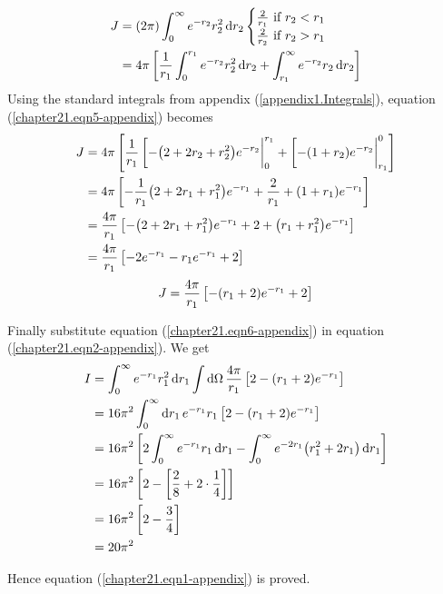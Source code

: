 	\begin{align}
		J &= \qty(2 \pi) \int_{0}^{\infty} e^{-r_2} r_2^2 \dd{r_2} 
		\begin{cases}
			\frac{2}{r_1} \ \text{if} \ r_2 < r_1 \\
			\frac{2}{r_2} \ \text{if} \ r_2 > r_1
		\end{cases}\nonumber\\
		&= 4\pi \left[
		\frac{1}{r_1} \int_{0}^{r_1} e^{-r_2} r_2^2 \dd{r_2} + \int_{r_1}^{\infty} e^{-r_2} r_2 \dd{r_2}
		\right]
		\label{chapter21.eqn5-appendix}
	\end{align}
	Using the standard integrals from appendix (\ref{appendix1.Integrals}), equation (\ref{chapter21.eqn5-appendix}) becomes
	\begin{align*}
		J &= 4 \pi \left[
		\frac{1}{r_1} \eval[-\qty(2 + 2 r_2 + r_2^2) e^{-r_2}|_{0}^{r_1} + \eval[-\qty( 1 + r_2) e^{-r_2}|_{r_1}^{0}
		\right]\\
		&= 4\pi \left[
		-\frac{1}{r_1} \qty(2 + 2 r_1 + r_1^2) e^{-r_1}
		+ \frac{2}{r_1} + \qty(1 + r_1) e^{-r_1}
		\right] \\
		&= \frac{4\pi}{r_1} \left[
		- \qty(2 + 2 r_1 + r_1^2) e^{-r_1}
		+ 2 + \qty(r_1 + r_1^2) e^{-r_1}
		\right] \\
		&= \frac{4\pi}{r_1} \left[
		-2 e^{-r_1} - r_1 e^{-r_1} + 2
		\right]
	\end{align*}
	\begin{equation}
		J = \frac{4\pi}{r_1} \left[
		-\qty(r_1  +  2) e^{-r_1} + 2
		\right]
		\label{chapter21.eqn6-appendix}
	\end{equation}
	
	Finally substitute equation (\ref{chapter21.eqn6-appendix}) in equation (\ref{chapter21.eqn2-appendix}). We get
	\begin{align*}
		I 
		&= \int_{0}^{\infty} e^{-r_1} r_1^2 \dd{r_1} \int \dd{\Omega} \frac{4\pi}{r_1} \left[2 - \qty(r_1 + 2) e ^{-r_1} \right]\\
		&= 16 \pi^2 \int_{0}^{\infty} \dd{r_1} e^{-r_1} r_1 \left[2 - \qty(r_1 + 2)e^{-r_1}\right] \\
		&= 16\pi^2 \left[
		2 \int_{0}^{\infty} e^{-r_1} r_1 \dd{r_1}
		- \int_{0}^{\infty} e^{-2 r_1} \qty(r_1^2 + 2 r_1) \dd{r_1}
		\right]\\
		&= 16 \pi^2 \left[2 - \left[\frac{2}{8} + 2 \cdot \frac{1}{4}\right]\right] \\
		&= 16 \pi^2 \left[2 - \frac{3}{4}\right] \\
		&= 20 \pi^2
	\end{align*}
	
	Hence equation (\ref{chapter21.eqn1-appendix}) is proved.